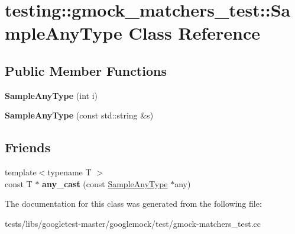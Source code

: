 \hypertarget{classtesting_1_1gmock__matchers__test_1_1SampleAnyType}{}\section{testing\+:\+:gmock\+\_\+matchers\+\_\+test\+:\+:Sample\+Any\+Type Class Reference}
\label{classtesting_1_1gmock__matchers__test_1_1SampleAnyType}
\subsection*{Public Member Functions}
\begin{DoxyCompactItemize}
\item 
\mbox{\label{classtesting_1_1gmock__matchers__test_1_1SampleAnyType_a8f77e083452210341cb9552fccb4aeab}} 
{\bfseries Sample\+Any\+Type} (int i)
\item 
\mbox{\label{classtesting_1_1gmock__matchers__test_1_1SampleAnyType_a1a9abd19e3f7ca8bc78c05fc5ee2299e}} 
{\bfseries Sample\+Any\+Type} (const std\+::string \&s)
\end{DoxyCompactItemize}
\subsection*{Friends}
\begin{DoxyCompactItemize}
\item 
\mbox{\label{classtesting_1_1gmock__matchers__test_1_1SampleAnyType_a5f0f90347eeb986f111c81e6592a74e6}} 
{\footnotesize template$<$typename T $>$ }\\const T $\ast$ {\bfseries any\+\_\+cast} (const \hyperlink{classtesting_1_1gmock__matchers__test_1_1SampleAnyType}{Sample\+Any\+Type} $\ast$any)
\end{DoxyCompactItemize}


The documentation for this class was generated from the following file\+:\begin{DoxyCompactItemize}
\item 
tests/libs/googletest-\/master/googlemock/test/gmock-\/matchers\+\_\+test.\+cc\end{DoxyCompactItemize}
